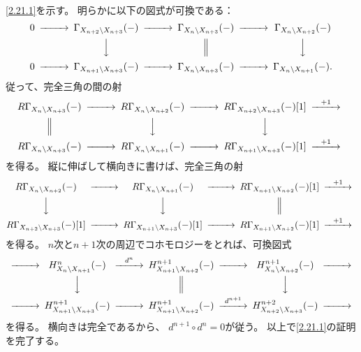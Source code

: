 \documentclass[uplatex,dvipdfmx]{jsarticle}
\makeatletter
\theoremstyle{definition}
\renewenvironment{proof}[1][\proofname]{
  \pushQED{\qed}%
  \normalfont \topsep6\p@\@plus6\p@\relax
  \trivlist
  \item[\hskip\labelsep
    #1\@addpunct{\textbf{.}}]\ignorespaces
}{%
  \popQED\endtrivlist\@endpefalse
}
\providecommand{\proofname}{証明}
\makeatother
\begin{document}
\begin{proof}
  \ref{2.21.1}を示す。
  明らかに以下の図式が可換である：
  \[
  \begin{CD}
    0 @>>> \Gamma_{X_{n+2}\setminus X_{n+3}}(-)
    @>>> \Gamma_{X_n\setminus X_{n+3}}(-)
    @>>> \Gamma_{X_n\setminus X_{n+2}}(-) \\
    @. @VVV @| @VVV \\
    0 @>>> \Gamma_{X_{n+1}\setminus X_{n+3}}(-)
    @>>> \Gamma_{X_n\setminus X_{n+3}}(-)
    @>>> \Gamma_{X_n\setminus X_{n+1}}(-).
  \end{CD}
  \]
  従って、完全三角の間の射
  \[
  \begin{CD}
    R\Gamma_{X_n\setminus X_{n+3}}(-)
    @>>> R\Gamma_{X_n\setminus X_{n+2}}(-)
    @>>> R\Gamma_{X_{n+2}\setminus X_{n+3}}(-)[1]
    @>{+1}>> \\
    @| @VVV @VVV @. \\
    R\Gamma_{X_n\setminus X_{n+3}}(-)
    @>>> R\Gamma_{X_n\setminus X_{n+1}}(-)
    @>>> R\Gamma_{X_{n+1}\setminus X_{n+3}}(-)[1]
    @>{+1}>>
  \end{CD}
  \]
  を得る。
  縦に伸ばして横向きに書けば、完全三角の射
  \[
  \begin{CD}
    R\Gamma_{X_n\setminus X_{n+2}}(-)
    @>>> R\Gamma_{X_n\setminus X_{n+1}}(-)
    @>>> R\Gamma_{X_{n+1}\setminus X_{n+2}}(-)[1]
    @>{+1}>> \\
    @VVV @VVV @| @. \\
    R\Gamma_{X_{n+2}\setminus X_{n+3}}(-)[1]
    @>>> R\Gamma_{X_{n+1}\setminus X_{n+3}}(-)[1]
    @>>> R\Gamma_{X_{n+1}\setminus X_{n+2}}(-)[1]
    @>{+1}>>
  \end{CD}
  \]
  を得る。
  \(n\)次と\(n+1\)次の周辺でコホモロジーをとれば、可換図式
  \[
  \begin{CD}
    @>>> H^n_{X_n\setminus X_{n+1}}(-)
    @>{d^n}>> H^{n+1}_{X_{n+1}\setminus X_{n+2}}(-)
    @>>> H^{n+1}_{X_n\setminus X_{n+2}} (-)
    @>>> \\
    @. @VVV @| @VVV @. \\
    @>>> H^{n+1}_{X_{n+1}\setminus X_{n+3}}(-)
    @>>> H^{n+1}_{X_{n+1}\setminus X_{n+2}}(-)
    @>{d^{n+1}}>> H^{n+2}_{X_{n+2}\setminus X_{n+3}} (-)
    @>>>
  \end{CD}
  \]
  を得る。
  横向きは完全であるから、
  \(d^{n+1}\circ d^n = 0\)が従う。
  以上で\ref{2.21.1}の証明を完了する。


\end{proof}
\end{document}
